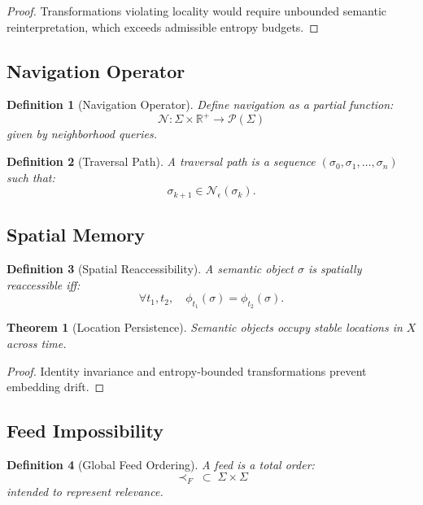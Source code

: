 \documentclass[11pt]{article}
\newtheorem{definition}{Definition}
\newtheorem{theorem}{Theorem}
\begin{document}
\begin{proof}
Transformations violating locality would require unbounded semantic reinterpretation,
which exceeds admissible entropy budgets.
\end{proof}

\subsection{Navigation Operator}

\begin{definition}[Navigation Operator]
Define navigation as a partial function:
\[
\mathcal{N} : \Sigma \times \mathbb{R}^+ \to \mathcal{P}(\Sigma)
\]
given by neighborhood queries.
\end{definition}

\begin{definition}[Traversal Path]
A traversal path is a sequence $(\sigma_0,\sigma_1,\dots,\sigma_n)$ such that:
\[
\sigma_{k+1} \in \mathcal{N}_\epsilon(\sigma_k).
\]
\end{definition}

\subsection{Spatial Memory}

\begin{definition}[Spatial Reaccessibility]
A semantic object $\sigma$ is spatially reaccessible iff:
\[
\forall t_1,t_2,\quad \phi_{t_1}(\sigma) = \phi_{t_2}(\sigma).
\]
\end{definition}

\begin{theorem}[Location Persistence]
Semantic objects occupy stable locations in $X$ across time.
\end{theorem}

\begin{proof}
Identity invariance and entropy-bounded transformations prevent embedding drift.
\end{proof}

\subsection{Feed Impossibility}

\begin{definition}[Global Feed Ordering]
A feed is a total order:
\[
\prec_F \; \subset \; \Sigma \times \Sigma
\]
intended to represent relevance.
\end{definition}
\end{document}

